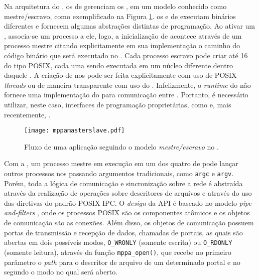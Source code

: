 Na arquitetura do \mppa, os \clusters de \IO gerenciam os \CCs, em um modelo conhecido como mestre/escravo, como exemplificado na Figura \ref{fig:masterslave}. os \CCs e \clusters de \IO executam binários diferentes e fornecem algumas abstrações distintas de programação. Ao ativar um \cluster, associa-se um processo a ele, logo, a inicialização de \CCs acontece através de um processo mestre citando explicitamente em sua implementação o caminho do código binário que será executado no \CC. Cada processo escravo pode criar até 16 \threads do tipo POSIX, cada uma sendo executada em um núcleo diferente dentro daquele \cluster. A criação de \threads nos \CCs pode ser feita explicitamente com uso de POSIX \textit{threads} ou de maneira transparente com uso do \OpenMP. Infelizmente, o \textit{runtime} do \mppa não fornece uma implementação do \MPI para comunicação entre \CCs. Portanto, é necessário utilizar, neste caso, interfaces de programação proprietárias, como \IPC e, mais recentemente, \ASYNC.

\begin{figure}[tb]
  \centering
  \caption{Fluxo de uma aplicação seguindo o modelo \textit{mestre/escravo} no \mppa.}
  \label{fig:masterslave}
  \texttt{[image: mppamasterslave.pdf]}
\end{figure}

Com a \IPC, um processo mestre em execução em um dos quatro \clusters de \IO pode lançar outros processos nos \CCs passando argumentos tradicionais, como \texttt{argc} e \texttt{argv}. Porém, toda a lógica de comunicação e sincronização sobre a rede \NoC é abstraída através da realização de operações sobre descritores de arquivos e através do uso das diretivas do padrão POSIX IPC. O \textit{design} da API é baseado no modelo \textit{pipe-and-filters} \cite{softwarecomponentmodels}, onde os processos POSIX são os componentes atômicos e os objetos de comunicação são as conexões. Além disso, os objetos de comunicação possuem portas de transmissão e recepção de dados, chamadas de portais, as quais são abertas em dois possíveis modos, \texttt{O\_WRONLY} (somente escrita) ou \texttt{O\_RDONLY} (somente leitura), através da função \texttt{mppa\_open()}, que recebe no primeiro parâmetro o \textit{path} para o descritor de arquivo de um determinado portal e no segundo o modo no qual será aberto.

